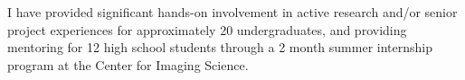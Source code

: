 

I have provided significant hands-on involvement in active research and/or senior project experiences for approximately 20 undergraduates, and providing mentoring for 12 high school students through a 2 month summer internship program at the Center for Imaging Science.
